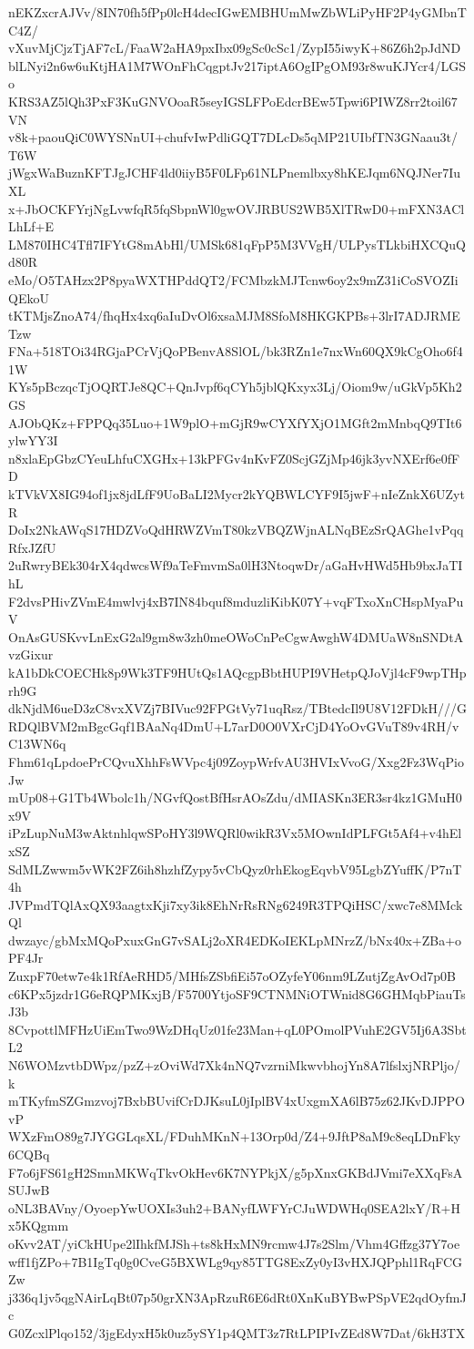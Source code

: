 nEKZxcrAJVv/8IN70fh5fPp0lcH4decIGwEMBHUmMwZbWLiPyHF2P4yGMbnTC4Z/
vXuvMjCjzTjAF7cL/FaaW2aHA9pxIbx09gSc0cSc1/ZypI55iwyK+86Z6h2pJdND
blLNyi2n6w6uKtjHA1M7WOnFhCqgptJv217iptA6OgIPgOM93r8wuKJYcr4/LGSo
KRS3AZ5lQh3PxF3KuGNVOoaR5seyIGSLFPoEdcrBEw5Tpwi6PIWZ8rr2toil67VN
v8k+paouQiC0WYSNnUI+chufvIwPdliGQT7DLcDs5qMP21UIbfTN3GNaau3t/T6W
jWgxWaBuznKFTJgJCHF4ld0iiyB5F0LFp61NLPnemlbxy8hKEJqm6NQJNer7IuXL
x+JbOCKFYrjNgLvwfqR5fqSbpnWl0gwOVJRBUS2WB5XlTRwD0+mFXN3AClLhLf+E
LM870IHC4Tfl7IFYtG8mAbHl/UMSk681qFpP5M3VVgH/ULPysTLkbiHXCQuQd80R
eMo/O5TAHzx2P8pyaWXTHPddQT2/FCMbzkMJTcnw6oy2x9mZ31iCoSVOZIiQEkoU
tKTMjsZnoA74/fhqHx4xq6aIuDvOl6xsaMJM8SfoM8HKGKPBs+3lrI7ADJRMETzw
FNa+518TOi34RGjaPCrVjQoPBenvA8SlOL/bk3RZn1e7nxWn60QX9kCgOho6f41W
KYs5pBczqcTjOQRTJe8QC+QnJvpf6qCYh5jblQKxyx3Lj/Oiom9w/uGkVp5Kh2GS
AJObQKz+FPPQq35Luo+1W9plO+mGjR9wCYXfYXjO1MGft2mMnbqQ9TIt6ylwYY3I
n8xlaEpGbzCYeuLhfuCXGHx+13kPFGv4nKvFZ0ScjGZjMp46jk3yvNXErf6e0fFD
kTVkVX8IG94of1jx8jdLfF9UoBaLI2Mycr2kYQBWLCYF9I5jwF+nIeZnkX6UZytR
DoIx2NkAWqS17HDZVoQdHRWZVmT80kzVBQZWjnALNqBEzSrQAGhe1vPqqRfxJZfU
2uRwryBEk304rX4qdwcsWf9aTeFmvmSa0lH3NtoqwDr/aGaHvHWd5Hb9bxJaTIhL
F2dvsPHivZVmE4mwlvj4xB7IN84bquf8mduzliKibK07Y+vqFTxoXnCHspMyaPuV
OnAsGUSKvvLnExG2al9gm8w3zh0meOWoCnPeCgwAwghW4DMUaW8nSNDtAvzGixur
kA1bDkCOECHk8p9Wk3TF9HUtQs1AQcgpBbtHUPI9VHetpQJoVjl4cF9wpTHprh9G
dkNjdM6ueD3zC8vxXVZj7BIVuc92FPGtVy71uqRsz/TBtedcIl9U8V12FDkH///G
RDQlBVM2mBgcGqf1BAaNq4DmU+L7arD0O0VXrCjD4YoOvGVuT89v4RH/vC13WN6q
Fhm61qLpdoePrCQvuXhhFsWVpc4j09ZoypWrfvAU3HVIxVvoG/Xxg2Fz3WqPioJw
mUp08+G1Tb4Wbolc1h/NGvfQostBfHsrAOsZdu/dMIASKn3ER3sr4kz1GMuH0x9V
iPzLupNuM3wAktnhlqwSPoHY3l9WQRl0wikR3Vx5MOwnIdPLFGt5Af4+v4hElxSZ
SdMLZwwm5vWK2FZ6ih8hzhfZypy5vCbQyz0rhEkogEqvbV95LgbZYuffK/P7nT4h
JVPmdTQlAxQX93aagtxKji7xy3ik8EhNrRsRNg6249R3TPQiHSC/xwc7e8MMckQl
dwzayc/gbMxMQoPxuxGnG7vSALj2oXR4EDKoIEKLpMNrzZ/bNx40x+ZBa+oPF4Jr
ZuxpF70etw7e4k1RfAeRHD5/MHfsZSbfiEi57oOZyfeY06nm9LZutjZgAvOd7p0B
c6KPx5jzdr1G6eRQPMKxjB/F5700YtjoSF9CTNMNiOTWnid8G6GHMqbPiauTsJ3b
8CvpottlMFHzUiEmTwo9WzDHqUz01fe23Man+qL0POmolPVuhE2GV5Ij6A3SbtL2
N6WOMzvtbDWpz/pzZ+zOviWd7Xk4nNQ7vzrniMkwvbhojYn8A7lfslxjNRPljo/k
mTKyfmSZGmzvoj7BxbBUvifCrDJKsuL0jIplBV4xUxgmXA6lB75z62JKvDJPPOvP
WXzFmO89g7JYGGLqsXL/FDuhMKnN+13Orp0d/Z4+9JftP8aM9c8eqLDnFky6CQBq
F7o6jFS61gH2SmnMKWqTkvOkHev6K7NYPkjX/g5pXnxGKBdJVmi7eXXqFsASUJwB
oNL3BAVny/OyoepYwUOXIs3uh2+BANyfLWFYrCJuWDWHq0SEA2lxY/R+Hx5KQgmm
oKvv2AT/yiCkHUpe2lIhkfMJSh+ts8kHxMN9rcmw4J7s2Slm/Vhm4Gffzg37Y7oe
wff1fjZPo+7B1IgTq0g0CveG5BXWLg9qy85TTG8ExZy0yI3vHXJQPphl1RqFCGZw
j336q1jv5qgNAirLqBt07p50grXN3ApRzuR6E6dRt0XnKuBYBwPSpVE2qdOyfmJc
G0ZcxlPlqo152/3jgEdyxH5k0uz5ySY1p4QMT3z7RtLPIPIvZEd8W7Dat/6kH3TX

